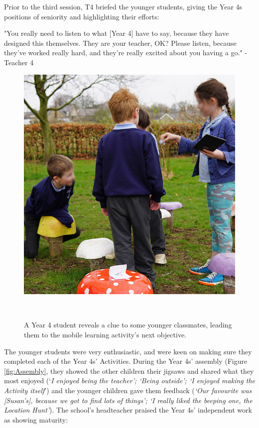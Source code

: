 Prior to the third session, T4 briefed the younger students, giving the Year 4s positions of seniority and highlighting their efforts:

\begin{displayquote}
"You really need to listen to what [Year 4] have to say, because they have designed this themselves. They are your teacher, OK? Please listen, because they've worked really hard, and they're really excited about you having a go." - Teacher 4
\end{displayquote}

\begin{figure}
\centering
  \includegraphics[width=0.66\columnwidth]{images/chapter08/mushrooms.jpg}
  \caption[Year 4 students using OurPlace]{A Year 4 student reveals a clue to some younger classmates, leading them to the mobile learning activity's next objective. }~\label{fig:Mushrooms}
\end{figure}

The younger students were very enthusiastic, and were keen on making sure they completed each of the Year 4s' Activities. During the Year 4s' assembly (Figure \ref{fig:Assembly}, they showed the other children their jigsaws and shared what they most enjoyed (`\textit{I enjoyed being the teacher'; `Being outside'; `I enjoyed making the Activity itself}') and the younger children gave them feedback (\textit{`Our favourite was [Susan's], because we got to find lots of things'; `I really liked the beeping one, the Location Hunt'}). The school's headteacher praised the Year 4s' independent work as showing maturity: 

